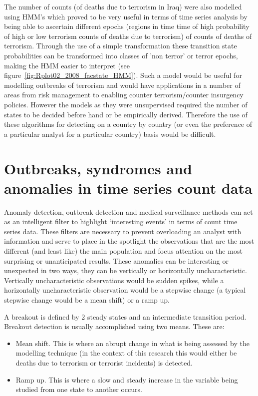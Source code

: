 The number of counts (of deaths due to terrorism in Iraq) were also modelled using HMM's which proved to be very useful in terms of time series analysis by being able to ascertain different epochs (regions in time time of high probability of high or low terrorism counts of deaths due to terrorism) of counts of deaths of terrorism. Through the use of a simple transformation these transition state probabilities can be transformed into classes of 'non terror' or terror epochs, making the HMM easier to interpret (see figure~\ref{fig:Rplot02_2008_facstate_HMM}). Such a model would be useful for modelling outbreaks of terrorism and would have applications in a number of areas from risk management to enabling counter terrorism/counter insurgency policies. However the models as they were unsupervised required the number of states to be decided before hand or be empirically derived. Therefore the use of these algorithms for detecting  on a country by country (or even the preference of a particular analyst for a particular country) basis would be difficult.

\section{Outbreaks, syndromes and anomalies in  time series count data} 

Anomaly detection, outbreak detection and medical surveillance methods can act as an intelligent filter to highlight ‘interesting events’ in terms of count time series data. These filters are necessary to prevent overloading an analyst with information and serve to place in the spotlight the observations that are the most different (and least like) the main population and focus attention on the most surprising or unanticipated results. These anomalies can be interesting or unexpected in two ways, they can be vertically or horizontally uncharacteristic. Vertically uncharacteristic observations would be sudden spikes, while a horizontally uncharacteristic observation would be a stepwise change (a typical stepwise change would be a mean shift) or a ramp up.

A breakout is defined by 2 steady states and an intermediate transition period. Breakout detection is usually accomplished using two means. These are:
\begin{itemize}
\item Mean shift. This is where an abrupt change in what is being assessed by the modelling technique (in the context of this research this would either be deaths due to terrorism or terrorist incidents) is detected. 
\item Ramp up. This is where a slow and steady increase in the variable being studied from one state to another occurs.
\end{itemize}

